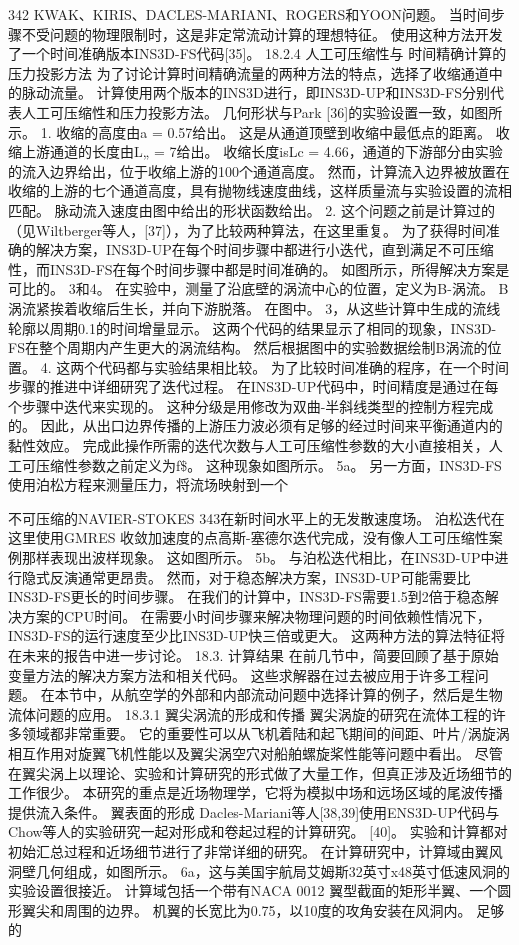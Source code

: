 \documentclass[UTF8,11pt,a4paper,openany,fontset=fandol]{ctexbook}
\begin{document}
342 KWAK、KIRIS、DACLES-MARIANI、ROGERS和YOON问题。 当时间步骤不受问题的物理限制时，这是非定常流动计算的理想特征。 使用这种方法开发了一个时间准确版本INS3D-FS代码[35]。 18.2.4 人工可压缩性与 时间精确计算的压力投影方法 为了讨论计算时间精确流量的两种方法的特点，选择了收缩通道中的脉动流量。 计算使用两个版本的INS3D进行，即INS3D-UP和INS3D-FS分别代表人工可压缩性和压力投影方法。 几何形状与Park [36]的实验设置一致，如图所示。 1. 收缩的高度由a = 0.57给出。 这是从通道顶壁到收缩中最低点的距离。 收缩上游通道的长度由L„ = 7给出。 收缩长度isLc = 4.66，通道的下游部分由实验的流入边界给出，位于收缩上游的100个通道高度。 然而，计算流入边界被放置在收缩的上游的七个通道高度，具有抛物线速度曲线，这样质量流与实验设置的流相匹配。 脉动流入速度由图中给出的形状函数给出。 2. 这个问题之前是计算过的（见Wiltberger等人，[37]），为了比较两种算法，在这里重复。 为了获得时间准确的解决方案，INS3D-UP在每个时间步骤中都进行小迭代，直到满足不可压缩性，而INS3D-FS在每个时间步骤中都是时间准确的。 如图所示，所得解决方案是可比的。 3和4。 在实验中，测量了沿底壁的涡流中心的位置，定义为B-涡流。 B涡流紧挨着收缩后生长，并向下游脱落。 在图中。 3，从这些计算中生成的流线轮廓以周期0.1的时间增量显示。 这两个代码的结果显示了相同的现象，INS3D-FS在整个周期内产生更大的涡流结构。 然后根据图中的实验数据绘制B涡流的位置。 4. 这两个代码都与实验结果相比较。 为了比较时间准确的程序，在一个时间步骤的推进中详细研究了迭代过程。 在INS3D-UP代码中，时间精度是通过在每个步骤中迭代来实现的。 这种分级是用修改为双曲-半斜线类型的控制方程完成的。 因此，从出口边界传播的上游压力波必须有足够的经过时间来平衡通道内的黏性效应。 完成此操作所需的迭代次数与人工可压缩性参数的大小直接相关，人工可压缩性参数之前定义为f\$。 这种现象如图所示。 5a。 另一方面，INS3D-FS使用泊松方程来测量压力，将流场映射到一个

不可压缩的NAVIER-STOKES 343在新时间水平上的无发散速度场。 泊松迭代在这里使用GMRES 收敛加速度的点高斯-塞德尔迭代完成，没有像人工可压缩性案例那样表现出波样现象。 这如图所示。 5b。 与泊松迭代相比，在INS3D-UP中进行隐式反演通常更昂贵。 然而，对于稳态解决方案，INS3D-UP可能需要比INS3D-FS更长的时间步骤。 在我们的计算中，INS3D-FS需要1.5到2倍于稳态解决方案的CPU时间。 在需要小时间步骤来解决物理问题的时间依赖性情况下，INS3D-FS的运行速度至少比INS3D-UP快三倍或更大。 这两种方法的算法特征将在未来的报告中进一步讨论。 18.3. 计算结果 在前几节中，简要回顾了基于原始变量方法的解决方案方法和相关代码。 这些求解器在过去被应用于许多工程问题。 在本节中，从航空学的外部和内部流动问题中选择计算的例子，然后是生物流体问题的应用。 18.3.1 翼尖涡流的形成和传播 翼尖涡旋的研究在流体工程的许多领域都非常重要。 它的重要性可以从飞机着陆和起飞期间的间距、叶片/涡旋涡相互作用对旋翼飞机性能以及翼尖涡空穴对船舶螺旋桨性能等问题中看出。 尽管在翼尖涡上以理论、实验和计算研究的形式做了大量工作，但真正涉及近场细节的工作很少。 本研究的重点是近场物理学，它将为模拟中场和远场区域的尾波传播提供流入条件。 翼表面的形成 Dacles-Mariani等人[38,39]使用ENS3D-UP代码与Chow等人的实验研究一起对形成和卷起过程的计算研究。 [40]。 实验和计算都对初始汇总过程和近场细节进行了非常详细的研究。 在计算研究中，计算域由翼风洞壁几何组成，如图所示。 6a，这与美国宇航局艾姆斯32英寸x48英寸低速风洞的实验设置很接近。 计算域包括一个带有NACA 0012 翼型截面的矩形半翼、一个圆形翼尖和周围的边界。 机翼的长宽比为0.75，以10度的攻角安装在风洞内。 足够的
\end{document}
